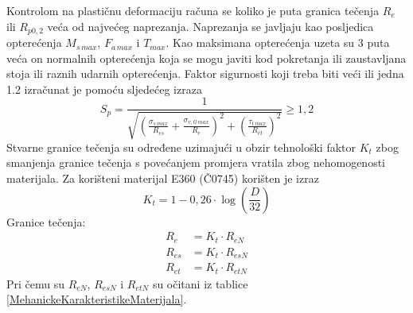 \documentclass[11pt,a4paper]{report}
\begin{document}
Kontrolom na plastičnu deformaciju računa se koliko je puta granica tečenja $R_e$ ili $R_{p0,2}$ veća od najvećeg naprezanja.
Naprezanja se javljaju kao posljedica opterećenja $M_{s \, max}$, $F_{a \, max}$ i $T_{max}$.
Kao maksimana opterećenja uzeta su 3 puta veća on normalnih opterećenja koja se mogu javiti kod pokretanja ili zaustavljana stoja ili raznih udarnih opterećenja.
Faktor sigurnosti koji treba biti veći ili jedna 1.2 izračunat je pomoću sljedećeg izraza
\begin{equation}
S_p=\frac{1}{\sqrt{\left( \frac{\sigma_{s \, max}}{R_{es}}+\frac{\sigma_{v,tl \, max}}{R_e}\right)^2+ \left( \frac{\tau_{t \, max}}{R_{et}}\right)^2}}\geq 1,2 \label{equ_faktorSigurnostiPlasticeDeformacije}
\end{equation}
Stvarne granice tečenja su određene uzimajući u obzir tehnološki faktor $K_t$ zbog smanjenja granice tečenja s povećanjem promjera vratila zbog nehomogenosti materijala. Za korišteni materijal E360 (Č0745) korišten je izraz
\begin{equation}
K_t=1-0,26\cdot \log \left( \frac{D}{32} \right) \label{equ:faktorKt}
\end{equation}
Granice tečenja:
\begin{align}
R_e &= K_t \cdot R_{eN} \label{equ:Re} \\
R_{es} &= K_t \cdot R_{esN} \label{equ:Res} \\
R_{et} &= K_t \cdot R_{etN} \label{equ:Ret}
\end{align}
Pri čemu su $R_{eN}$, $R_{esN}$ i $R_{etN}$ su očitani iz tablice \ref{MehanickeKarakteristikeMaterijala}.
\end{document}
